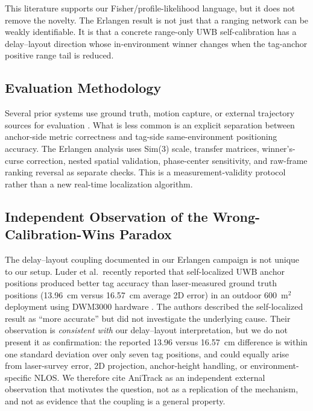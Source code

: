 \documentclass[11pt,a4paper]{article}
\begin{document}
This literature supports our Fisher/profile-likelihood language, but it does not remove the novelty. The Erlangen result is not just that a ranging network can be weakly identifiable. It is that a concrete range-only UWB self-calibration has a delay--layout direction whose in-environment winner changes when the tag-anchor positive range tail is reduced.

\subsection{Evaluation Methodology}

Several prior systems use ground truth, motion capture, or external trajectory sources for evaluation \citep{lutz_2019_visual_inertial_slam_uwb_error_model,ledergerber_2018_calibrating_away_inaccuracies_uwb,queralta_2020_uwb_based_system_for_uav}. What is less common is an explicit separation between anchor-side metric correctness and tag-side same-environment positioning accuracy. The Erlangen analysis uses Sim(3) scale, transfer matrices, winner's-curse correction, nested spatial validation, phase-center sensitivity, and raw-frame ranking reversal as separate checks. This is a measurement-validity protocol rather than a new real-time localization algorithm.

\subsection{Independent Observation of the Wrong-Calibration-Wins Paradox}

The delay--layout coupling documented in our Erlangen campaign is not unique to our
setup. Luder et al.\ recently reported that self-localized UWB anchor positions
produced better tag accuracy than laser-measured ground truth positions (13.96~cm
versus 16.57~cm average 2D error) in an outdoor 600~m$^2$ deployment using DWM3000
hardware \citep{luder_2025_anitrack}. The authors described the self-localized result as ``more accurate'' but did not
investigate the underlying cause. Their observation is \emph{consistent with} our
delay--layout interpretation, but we do not present it as confirmation: the reported
13.96 versus 16.57~cm difference is within one standard deviation over only seven tag
positions, and could equally arise from laser-survey error, 2D projection,
anchor-height handling, or environment-specific NLOS. We therefore cite AniTrack as an
independent external observation that motivates the question, not as a replication of
the mechanism, and not as evidence that the coupling is a general property.
\end{document}

